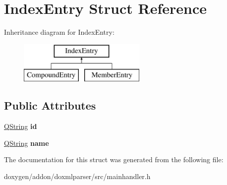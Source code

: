 \hypertarget{struct_index_entry}{}\section{Index\+Entry Struct Reference}
\label{struct_index_entry}
Inheritance diagram for Index\+Entry\+:\begin{figure}[H]
\begin{center}
\leavevmode
\includegraphics[height=2.000000cm]{struct_index_entry}
\end{center}
\end{figure}
\subsection*{Public Attributes}
\begin{DoxyCompactItemize}
\item 
\mbox{\label{struct_index_entry_a9e610928614a789b62200befb08af82d}} 
\mbox{\hyperlink{class_q_string}{Q\+String}} {\bfseries id}
\item 
\mbox{\label{struct_index_entry_a8901d67955ab91e97f4a8152eacf30dc}} 
\mbox{\hyperlink{class_q_string}{Q\+String}} {\bfseries name}
\end{DoxyCompactItemize}


The documentation for this struct was generated from the following file\+:\begin{DoxyCompactItemize}
\item 
doxygen/addon/doxmlparser/src/mainhandler.\+h\end{DoxyCompactItemize}
